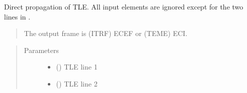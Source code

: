 \documentclass[letterpaper,10pt,english]{sphinxmanual}
\begin{document}
\begin{fulllineitems}
\begin{fulllineitems}
\label{\detokenize{modules/propagator_sgp4:propagator_sgp4.PropagatorTLE.get_orbit_cart}}

Direct propagation of TLE. All input elements are ignored except for the two lines in .

\begin{quote}

The output frame is (ITRF) ECEF or (TEME) ECI.
\end{quote}
\begin{quote}\begin{description}
\item[{Parameters}] \leavevmode\begin{itemize}
\item {} 
 () \textendash{} TLE line 1

\item {} 
 () \textendash{} TLE line 2

\end{itemize}

\end{description}\end{quote}

\end{fulllineitems}


\end{fulllineitems}

\end{document}
